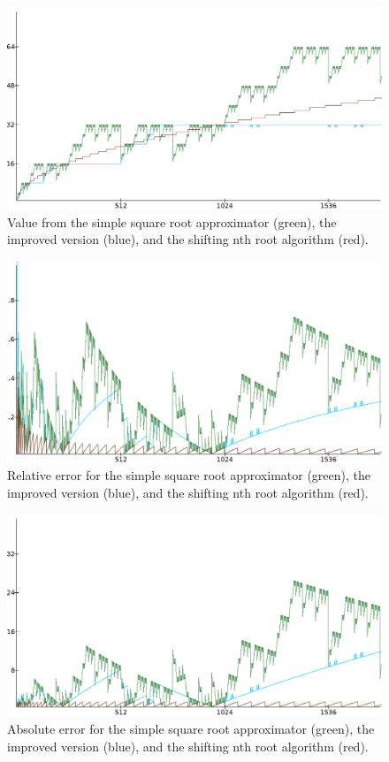 		\begin{figure}[H]
			\centering
			\includegraphics[width=0.75\linewidth]{figure/value12x.png} 
			\caption{Value from the simple square root approximator (green),
				the improved version (blue), and the shifting nth root 
				algorithm (red).}
			\label{sres1}
		\end{figure}

		\begin{figure}[H]
			\centering
			\includegraphics[width=0.75\linewidth]{figure/rel_error_480x.png} 
			\caption{Relative error for the simple square root approximator
				(green), the improved version (blue), and the shifting nth root
				algorithm (red).}
			\label{sres2}
		\end{figure}

		\begin{figure}[H]
			\centering
			\includegraphics[width=0.75\linewidth]{figure/abs_error_24x.png} 
			\caption{Absolute error for the simple square root approximator
				(green), the improved version (blue), and the shifting nth root
				algorithm (red).}
			\label{sres3}
		\end{figure}

